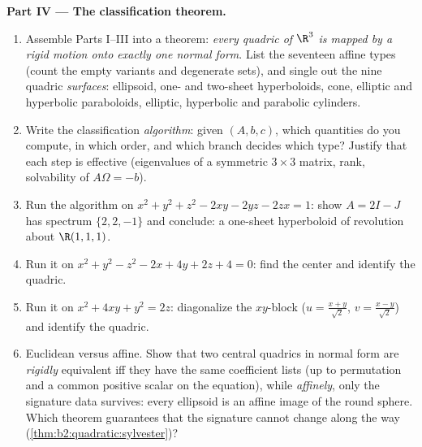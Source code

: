 \begin{problem}
\medskip
\noindent\textbf{Part IV --- The classification theorem.}
\begin{enumerate}[resume]
  \item Assemble Parts I--III into a theorem: \emph{every
        quadric of $\R^3$ is mapped by a rigid motion onto
        exactly one normal form}. List the seventeen affine
        types (count the empty variants and degenerate sets),
        and single out the nine quadric \emph{surfaces}:
        ellipsoid, one- and two-sheet hyperboloids, cone,
        elliptic and hyperbolic paraboloids, elliptic,
        hyperbolic and parabolic cylinders.
  \item Write the classification \emph{algorithm}: given $(A,
        b, c)$, which quantities do you compute, in which
        order, and which branch decides which type? Justify
        that each step is effective (eigenvalues of a
        symmetric $3\times3$ matrix, rank, solvability of
        $A\Omega = -b$).
  \item Run the algorithm on $x^2 + y^2 + z^2 - 2xy - 2yz -
        2zx = 1$: show $A = 2I - J$ has spectrum $\{2, 2,
        -1\}$ and conclude: a one-sheet hyperboloid of
        revolution about $\R(1,1,1)$.
  \item Run it on $x^2 + y^2 - z^2 - 2x + 4y + 2z + 4 = 0$:
        find the center and identify the quadric.
  \item Run it on $x^2 + 4xy + y^2 = 2z$: diagonalize the
        $xy$-block ($u = \frac{x+y}{\sqrt2}$, $v =
        \frac{x-y}{\sqrt2}$) and identify the quadric.
  \item Euclidean versus affine. Show that two central
        quadrics in normal form are \emph{rigidly} equivalent
        iff they have the same coefficient lists (up to
        permutation and a common positive scalar on the
        equation), while \emph{affinely}, only the signature
        data survives: every ellipsoid is an affine image of
        the round sphere. Which theorem guarantees that the
        signature cannot change along the way
        (\cref{thm:b2:quadratic:sylvester})?
\end{enumerate}


\end{problem}
